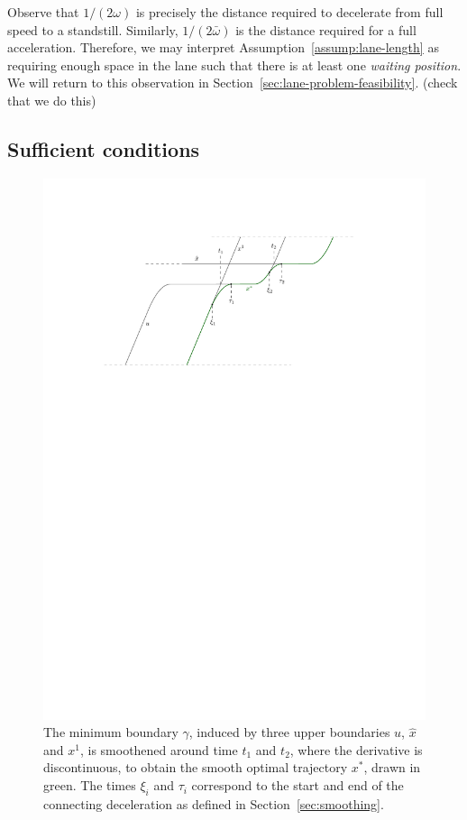 \documentclass[a4paper]{report}
\theoremstyle{definition}
\theoremstyle{plain}
\newcommand\note[1]{{\color{Navy}\noindent#1}}
\begin{document}
Observe that $1/(2\omega)$ is precisely the distance required to decelerate from
full speed to a standstill. Similarly, $1/(2\bar{\omega})$ is the distance
required for a full acceleration. Therefore, we may interpret
Assumption~\ref{assump:lane-length} as requiring enough space in the lane such
that there is at least one \emph{waiting position}.
%
We will return to this observation in
Section~\ref{sec:lane-problem-feasibility}.
\note{(check that we do this)}


\subsection{Sufficient conditions}\label{sec:optimal-trajectory}

\begin{figure}
  \centering
  \includegraphics[scale=1]{figures/motion/proof}
  \caption{The minimum boundary $\gamma$, induced by three upper boundaries
    $u$, $\hat{x}$ and $x^{1}$, is smoothened around time $t_{1}$ and
    $t_{2}$, where the derivative is discontinuous, to obtain the smooth optimal
    trajectory $x^{*}$, drawn in green. The times $\xi_{i}$ and $\tau_{i}$
    correspond to the start and end of the connecting deceleration as
    defined in Section~\ref{sec:smoothing}.}%
  \label{fig:optimal-construction}
\end{figure}
\end{document}

